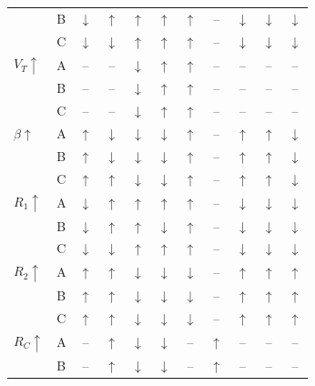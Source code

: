 \documentclass[11pt, a4paper]{article}
\begin{document}
{\begin{longtable}{llccccccccc}
    & B & $\downarrow$ & $\uparrow$ & $\uparrow$ & $\uparrow$ & $\uparrow$ & -- & $\downarrow$ & $\downarrow$ & $\downarrow$ \\
    & C & $\downarrow$ & $\downarrow$ & $\uparrow$ & $\uparrow$ & $\uparrow$ & -- & $\downarrow$ & $\downarrow$ & $\downarrow$ \\
    \midrule
    $V_T \uparrow$
    & A & -- & -- & $\downarrow$ & $\uparrow$ & $\uparrow$ & -- & -- & -- & -- \\
    & B & -- & -- & $\downarrow$ & $\uparrow$ & $\uparrow$ & -- & -- & -- & -- \\
    & C & -- & -- & $\downarrow$ & $\uparrow$ & $\uparrow$ & -- & -- & -- & -- \\
    \midrule
    $\beta \uparrow$
    & A & $\uparrow$ & $\downarrow$ & $\downarrow$ & $\downarrow$ & $\uparrow$ & -- & $\uparrow$ & $\uparrow$ & $\downarrow$ \\
    & B & $\uparrow$ & $\downarrow$ & $\downarrow$ & $\downarrow$ & $\uparrow$ & -- & $\uparrow$ & $\uparrow$ & $\downarrow$ \\
    & C & $\uparrow$ & $\uparrow$ & $\downarrow$ & $\downarrow$ & $\uparrow$ & -- & $\uparrow$ & $\uparrow$ & $\downarrow$ \\
    \midrule
    $R_1 \uparrow$
    & A & $\downarrow$ & $\uparrow$ & $\uparrow$ & $\uparrow$ & $\uparrow$ & -- & $\downarrow$ & $\downarrow$ & $\downarrow$ \\
    & B & $\downarrow$ & $\uparrow$ & $\uparrow$ & $\downarrow$ & $\uparrow$ & -- & $\downarrow$ & $\downarrow$ & $\downarrow$ \\
    & C & $\downarrow$ & $\downarrow$ & $\uparrow$ & $\uparrow$ & $\uparrow$ & -- & $\downarrow$ & $\downarrow$ & $\downarrow$ \\
    \midrule
    $R_2 \uparrow$
    & A & $\uparrow$ & $\uparrow$ & $\downarrow$ & $\downarrow$ & $\downarrow$ & -- & $\uparrow$ & $\uparrow$ & $\uparrow$ \\
    & B & $\uparrow$ & $\uparrow$ & $\downarrow$ & $\downarrow$ & $\downarrow$ & -- & $\uparrow$ & $\uparrow$ & $\uparrow$ \\
    & C & $\uparrow$ & $\uparrow$ & $\downarrow$ & $\downarrow$ & $\downarrow$ & -- & $\uparrow$ & $\uparrow$ & $\uparrow$ \\
    \midrule
    $R_C \uparrow$
    & A & -- & $\uparrow$ & $\downarrow$ & $\downarrow$ & -- & $\uparrow$ & -- & -- & -- \\
    & B & -- & $\uparrow$ & $\downarrow$ & $\downarrow$ & -- & $\uparrow$ & -- & -- & -- \\

\end{longtable}}
\end{document}
